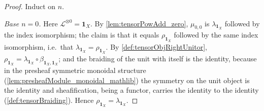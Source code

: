 \begin{proof}
  Induct on \(n\).

  \emph{Base \(n = 0\).} Here \(\mathcal{L}^{\otimes 0} = \mathbf{1}_X\). By
  \cref{lem:tensorPowAdd_zero}, \(\mu_{0,0}\) is
  \(\lambda_{\mathbf{1}_X}\) followed by the index isomorphism; the claim is that
  it equals \(\rho_{\mathbf{1}_X}\) followed by the same index isomorphism, i.e.\
  that \(\lambda_{\mathbf{1}_X} = \rho_{\mathbf{1}_X}\). By
  \cref{def:tensorObjRightUnitor},
  \(\rho_{\mathbf{1}_X} = \lambda_{\mathbf{1}_X} \circ
  \beta_{\mathbf{1}_X,\mathbf{1}_X}\); and the braiding of the unit with itself is
  the identity, because in the presheaf symmetric monoidal structure
  (\cref{lem:presheafModule_monoidal_mathlib}) the symmetry on the unit object is
  the identity and sheafification, being a functor, carries the identity to the
  identity (\cref{def:tensorBraiding}). Hence
  \(\rho_{\mathbf{1}_X} = \lambda_{\mathbf{1}_X}\).


\end{proof}
